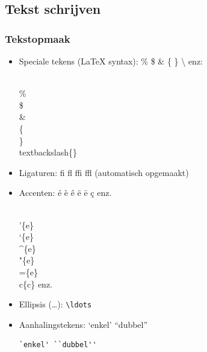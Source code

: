 \documentclass{beamer}
\begin{document}
\subsection{Tekst schrijven}

\begin{frame}[fragile]
  \frametitle{Tekstopmaak}
  
  \begin{itemize}
  \item<+-> Speciale tekens ({\LaTeX} syntax): \% \$ \& \{ \} \textbackslash{} enz: \\
\begin{semiverbatim}
\\\% \\\$ \\\& \\\{ \\\} \\textbackslash\{\}
\end{semiverbatim}
  \item<+-> Ligaturen: \textrm{fi fl ffi ffl} (automatisch opgemaakt)
  \item<+-> Accenten: \'{e} \`{e} \^{e} \"{e} \={e} \c{c} enz.
\begin{semiverbatim}
\\'\{e\} \\`\{e\} \\^\{e\} \\"\{e\} \\=\{e\} \\c\{c\} enz.
\end{semiverbatim}
  \item<+-> Ellipsis (\ldots): \texttt{\textbackslash{}ldots}
  \item<+-> Aanhalingstekens: `enkel' ``dubbel''
\begin{verbatim}
`enkel' ``dubbel''
\end{verbatim}
  \end{itemize}
\end{frame}
\end{document}
